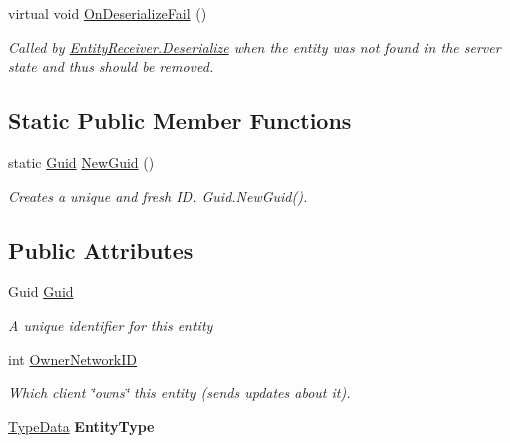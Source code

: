 \begin{DoxyCompactItemize}
virtual void \hyperlink{class_skyrates_1_1_common_1_1_entity_1_1_entity_a8cf85f4ac28cf907926eef27148e5124}{On\-Deserialize\-Fail} ()
\begin{DoxyCompactList}\small\item\em Called by \hyperlink{class_skyrates_1_1_common_1_1_entity_1_1_entity_receiver_a9da0b7c3a8b9e1ed7d10be74ce80482b}{Entity\-Receiver.\-Deserialize} when the entity was not found in the server state and thus should be removed. \end{DoxyCompactList}\end{DoxyCompactItemize}
\subsection*{Static Public Member Functions}
\begin{DoxyCompactItemize}
\item 
static \hyperlink{class_skyrates_1_1_common_1_1_entity_1_1_entity_ae32af79e6a33bed16aeb0455078885c8}{Guid} \hyperlink{class_skyrates_1_1_common_1_1_entity_1_1_entity_ace456648a3f02f014603fd4a0d38e468}{New\-Guid} ()
\begin{DoxyCompactList}\small\item\em Creates a unique and fresh I\-D. Guid.\-New\-Guid(). \end{DoxyCompactList}\end{DoxyCompactItemize}
\subsection*{Public Attributes}
\begin{DoxyCompactItemize}
\item 
Guid \hyperlink{class_skyrates_1_1_common_1_1_entity_1_1_entity_ae32af79e6a33bed16aeb0455078885c8}{Guid}
\begin{DoxyCompactList}\small\item\em A unique identifier for this entity \end{DoxyCompactList}\item 
int \hyperlink{class_skyrates_1_1_common_1_1_entity_1_1_entity_a855cbcf588c2b4c490c2ddc157e11029}{Owner\-Network\-I\-D}
\begin{DoxyCompactList}\small\item\em Which client \char`\"{}owns\char`\"{} this entity (sends updates about it). \end{DoxyCompactList}\item 
\hypertarget{class_skyrates_1_1_common_1_1_entity_1_1_entity_a8ef114b37dd21d60738f10e02ace66a2}{\hyperlink{class_skyrates_1_1_common_1_1_entity_1_1_entity_1_1_type_data}{Type\-Data} {\bfseries Entity\-Type}}\label{class_skyrates_1_1_common_1_1_entity_1_1_entity_a8ef114b37dd21d60738f10e02ace66a2}

\end{DoxyCompactItemize}
